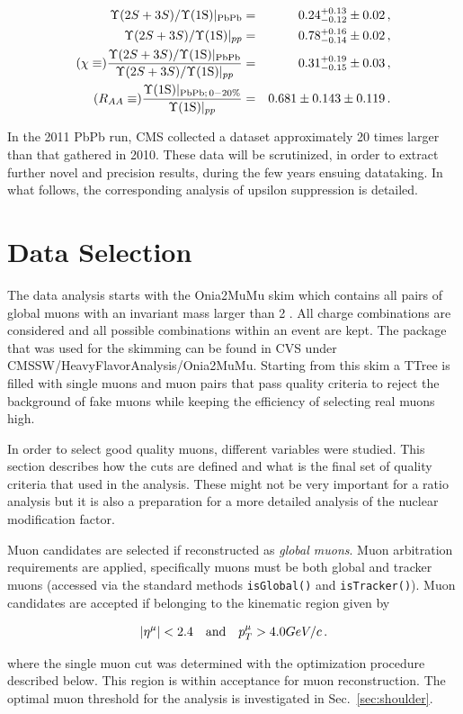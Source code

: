 %
\begin{linenomath}
\begin{eqnarray}
  \Upsilon(2S+3S)/\Upsilon\text{(1S)}|_{\text{PbPb}} & = & 0.24 _{-0.12}^{+0.13} \pm 0.02\,, \nonumber \\
  \Upsilon(2S+3S)/\Upsilon\text{(1S)}|_{{pp}} & = & 0.78 _{-0.14}^{+0.16} \pm 0.02\,,  \nonumber \\
(\chi \equiv)
  \frac{\Upsilon(2S+3S)/\Upsilon\text{(1S)}|_{\text{PbPb}}}{\Upsilon(2S+3S)/\Upsilon\text{(1S)}|_{{pp}}}
 & = & 0.31 _{-0.15}^{+0.19} \pm 0.03 \,,  \nonumber \\
(R_{AA} \equiv)
 \frac{\Upsilon\text{(1S)}|_{\text{PbPb};\, 0-20\%}}{\Upsilon\text{(1S)}|_{{pp}}}
& = & 0.681 \pm 0.143 \pm 0.119 \,.  \nonumber
\end{eqnarray}
\end{linenomath}
In the 2011 PbPb run, CMS collected a dataset approximately 20 times larger than that gathered in 2010. 
These data will be scrutinized, in order to extract further novel and precision results, during the 
few years ensuing datataking.
In what follows, the corresponding analysis of upsilon suppression is detailed.


\section{Data Selection}
\label{sec:dataselection}
The data analysis starts with the Onia2MuMu skim which contains all pairs of global muons with an invariant mass larger than 2 \GeVc. 
All charge combinations are considered and all possible combinations within an event are kept.
The package that was used for the skimming can be found in CVS under CMSSW/HeavyFlavorAnalysis/Onia2MuMu.
Starting from this skim a TTree is filled with single muons and muon pairs that pass quality
criteria to reject the background of fake muons while keeping the efficiency of selecting real muons high.

In order to select good quality muons, different variables were studied. This section describes how the cuts are defined and what is 
the final set of quality criteria that used in the analysis. These might not be very important for a ratio analysis but it is also a 
preparation for a more detailed analysis of the nuclear modification factor.

Muon candidates are selected if reconstructed as \emph{global muons}. Muon arbitration requirements are applied, 
specifically muons must be both global and tracker muons (accessed via the standard methods {\tt{isGlobal()}} and {\tt{isTracker()}}). 
Muon candidates are accepted if belonging to the kinematic region given by 
%
\begin{linenomath}
\begin{equation}
|\eta^\mu|<2.4 \quad \text{and} \quad p_T^\mu>4.0 GeV/c \,.
\label{eqn:muon_acc}
\end{equation}
\end{linenomath}
%
where the single muon \pt cut was determined with the optimization procedure described below.
This region is within acceptance for muon reconstruction. The optimal muon \pt threshold for the analysis is 
investigated in Sec.~\ref{sec:shoulder}.

